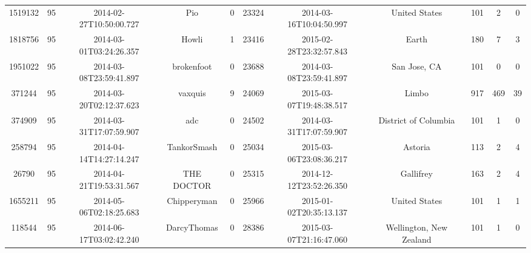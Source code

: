 \documentclass[12pt,a4paper,twoside,openright,titlepage,final]{article}
\begin{document}
\begin{landscape}
\begin{center}
\begin{longtable}{@{\extracolsep{\fill}}*{11}{c}}
			1519132            & 95           & 2014-02-27T10:50:00.727 & Pio                  & 0                  & 23324       & 2014-03-16T10:04:50.997 & United States           & 101                 & 2                & 0              \\
			1818756            & 95           & 2014-03-01T03:24:26.357 & Howli                & 1                  & 23416       & 2015-02-28T23:32:57.843 & Earth                   & 180                 & 7                & 3              \\
			1951022            & 95           & 2014-03-08T23:59:41.897 & brokenfoot           & 0                  & 23688       & 2014-03-08T23:59:41.897 & San Jose, CA            & 101                 & 0                & 0              \\
			371244             & 95           & 2014-03-20T02:12:37.623 & vaxquis              & 9                  & 24069       & 2015-03-07T19:48:38.517 & Limbo                   & 917                 & 469              & 39             \\
			374909             & 95           & 2014-03-31T17:07:59.907 & adc                  & 0                  & 24502       & 2014-03-31T17:07:59.907 & District of Columbia    & 101                 & 1                & 0              \\
			258794             & 95           & 2014-04-14T14:27:14.247 & TankorSmash          & 0                  & 25034       & 2015-03-06T23:08:36.217 & Astoria                 & 113                 & 2                & 4              \\
			26790              & 95           & 2014-04-21T19:53:31.567 & THE DOCTOR           & 0                  & 25315       & 2014-12-12T23:52:26.350 & Gallifrey               & 163                 & 2                & 4              \\
			1655211            & 95           & 2014-05-06T02:18:25.683 & Chipperyman          & 0                  & 25966       & 2015-01-02T20:35:13.137 & United States           & 101                 & 1                & 1              \\
			118544             & 95           & 2014-06-17T03:02:42.240 & DarcyThomas          & 0                  & 28386       & 2015-03-07T21:16:47.060 & Wellington, New Zealand & 101                 & 1                & 0              \\
\end{longtable}
\end{center}
\end{landscape}
\end{document}
